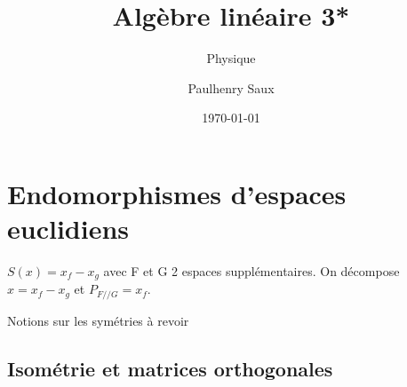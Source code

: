 \documentclass[french]{yLectureNote}
\title{Algèbre linéaire 3*}
\subtitle{Physique}
\author{Paulhenry Saux}
\date{\today}
\begin{document}
\setcounter{chapter}{1}


\chapter{Endomorphismes d'espaces euclidiens}
$S(x) = x_f-x_g$ avec F et G 2 espaces supplémentaires. On décompose $x = x_f-x_g$ et $P_{F//G}=x_f$.

Notions sur les symétries à revoir
\section{Isométrie et matrices orthogonales}
\end{document}
